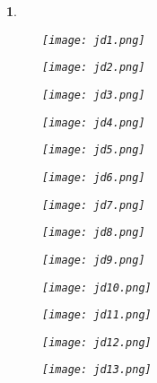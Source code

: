 \documentclass[UTF8]{report}
\theoremstyle{MyLineTheoremStyle} %
\theoremstyle{MyBlockTheoremStyle} %
\theoremstyle{MySubsubsectionStyle} %
\newtheorem{definition}{}
\begin{document}
\begin{definition}
    \begin{figure}[H]
        \centering
        \texttt{[image: jd1.png]}
    \end{figure}

    \begin{figure}[H]
        \centering
        \texttt{[image: jd2.png]}
    \end{figure}

    \begin{figure}[H]
        \centering
        \texttt{[image: jd3.png]}
    \end{figure}

    \begin{figure}[H]
        \centering
        \texttt{[image: jd4.png]}
    \end{figure}

    \begin{figure}[H]
        \centering
        \texttt{[image: jd5.png]}
    \end{figure}

    \begin{figure}[H]
        \centering
        \texttt{[image: jd6.png]}
    \end{figure}

    \begin{figure}[H]
        \centering
        \texttt{[image: jd7.png]}
    \end{figure}

    \begin{figure}[H]
        \centering
        \texttt{[image: jd8.png]}
    \end{figure}

    \begin{figure}[H]
        \centering
        \texttt{[image: jd9.png]}
    \end{figure}

    \begin{figure}[H]
        \centering
        \texttt{[image: jd10.png]}
    \end{figure}

    \begin{figure}[H]
        \centering
        \texttt{[image: jd11.png]}
    \end{figure}

    \begin{figure}[H]
        \centering
        \texttt{[image: jd12.png]}
    \end{figure}

    \begin{figure}[H]
        \centering
        \texttt{[image: jd13.png]}
    \end{figure}
\end{definition}
\end{document}
